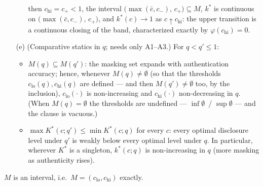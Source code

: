 \begin{proposition}
\begin{itemize}
\begin{itemize}
then $c_{\mathrm{hi}} = c_+ < 1$, the interval
$\bigl( \max(\bar c, c_-),\, c_+ \bigr) \subseteq M$, $k^*$ is continuous on
$\bigl( \max(\bar c, c_-),\, c_+ \bigr)$, and $k^*(c) \to 1$ as
$c \uparrow c_{\mathrm{hi}}$: the upper transition is a continuous closing of the band,
characterized exactly by $\varphi(c_{\mathrm{hi}}) = 0$.
\end{itemize}
\item[\textup{(e)}] \textup{(Comparative statics in $q$; needs only A1--A3.)} For
$q < q' \le 1$:
\begin{itemize}
\item $M(q) \subseteq M(q')$: the masking set expands with authentication accuracy;
hence, whenever $M(q) \neq \emptyset$ (so that the thresholds $c_{\mathrm{lo}}(q),
c_{\mathrm{hi}}(q)$ are defined --- and then $M(q') \neq \emptyset$ too, by the
inclusion), $c_{\mathrm{lo}}(\cdot)$ is non-increasing and $c_{\mathrm{hi}}(\cdot)$
non-decreasing in $q$. (When $M(q) = \emptyset$ the thresholds are undefined ---
$\inf \emptyset$~/ $\sup \emptyset$ --- and the clause is vacuous.)
\item $\max K^*(c; q') \le \min K^*(c; q)$ for every $c$: every optimal disclosure
level under $q'$ is weakly below every optimal level under $q$. In particular, wherever
$K^*$ is a singleton, $k^*(c; q)$ is non-increasing in $q$ (more masking as
authenticity rises).
\end{itemize}
\end{itemize}
\end{proposition}

\begin{conjecture}[Connectedness of $M$]\label{conj:connected}
$M$ is an interval, i.e.\ $M = (c_{\mathrm{lo}}, c_{\mathrm{hi}})$ exactly.
\end{conjecture}

